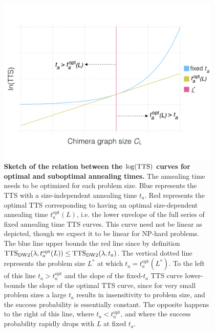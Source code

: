 \begin{figure}[t]
\begin{center}
\includegraphics[width=\columnwidth]{chapters/Planted/TTS_Illustration.pdf}
\caption{\textbf{Sketch of the relation between the $\log(\textrm{TTS})$ curves for optimal and suboptimal annealing times.} The  annealing time needs to be optimized for each problem size. Blue represents the TTS with a size-independent annealing time $t_a$.  Red represents the optimal TTS corresponding to having an optimal size-dependent annealing time $t_a^{\mathrm{opt}}(L)$, i.e. the lower envelope of the full series of fixed annealing time TTS curves.  This curve need not be linear as depicted, though we expect it to be linear for NP-hard problems. The blue line upper bounds the red line since by definition $\textrm{TTS}_{\textrm{DW2}}(\lambda,t_a^{\mathrm{opt}}(L)) \leq \textrm{TTS}_{\textrm{DW2}}(\lambda,t_a)$. The vertical dotted line represents the problem size $L^*$ at which $t_a = t_a^\textrm{opt}(L^*)$. To the left of this line $t_a > t_a^{\mathrm{opt}}$ and the slope of the fixed-$t_a$ TTS curve lower-bounds the slope of the optimal TTS curve, since for very small problem sizes a large $t_a$ results in insensitivity to problem size, and the success probability is essentially constant. The opposite happens to the right of this line, where $t_a < t_a^{\mathrm{opt}}$, and where the success probability rapidly drops with $L$ at fixed $t_a$. }
\label{fig:TTS_Illustration}
\end{center}
\end{figure}

